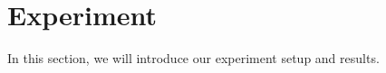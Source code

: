 \section{Experiment}
In this section, we will introduce our experiment setup and results.

\begin{comment}
\KZ{The following descriptions of the 3 datasets are too verbose.
Simplify each into one or two sentences and put into \tabref{tab:statitics-datasets}.}
\begin{itemize}

\item Context Abstraction: Necessary Additional Rewritten Discourse (\textbf{CANARD}) \citep{elgohary-etal-2019-unpack}. The authors crowdsource context-independent paraphrases of QUAC \citep{choi-etal-2018-quac} questions and use the paraphrases to train and evaluate question-in-context rewriting. The first sentence of the multi-turn dialogue is usually a news title or the name of a person. Then two people will 
talk around the 
context. 
The rewriting of the current turn of question will be given at the end.

\item Contextual Query Rewrite (\textbf{CQR}) \citep{DBLP:journals/corr/abs-1903-11783}. One task-oriented multi-turn dialogue dataset, the dialogues in which take place between human users and intelligent agents. Users will ask the intelligent agent to 
answer specific questions such as driving or shopping. The user's unclear requirements will be completed as the ground truth.

\item Multi-domain Coreference (\textbf{MuDoCo}) \citep{martin-etal-2020-mudoco}. The dataset contains authored dialogs between a ficional user and system, where the user asks the system to perform extensive tasks within multiple domains, as well as switch across a set of 6 task domains (calling, messaging, reminders, weather, news, and music).




\end{itemize}

\end{comment}

